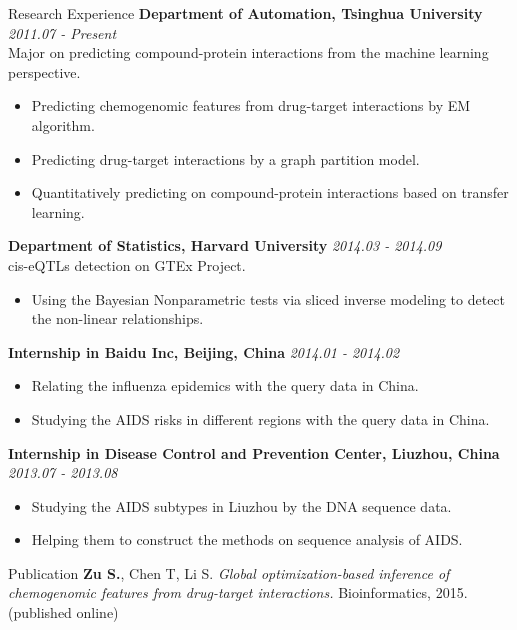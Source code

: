 \documentclass{resume} %
\begin{document}
\begin{rSection}{Research Experience}
{\bf Department of Automation, Tsinghua University} \hfill {\em 2011.07 - Present}\\
Major on predicting compound-protein interactions from the machine learning perspective.
\vspace{-3mm}
\begin{itemize}
\item Predicting chemogenomic features from drug-target interactions by EM algorithm.
\item Predicting drug-target interactions by a graph partition model.
\item Quantitatively predicting on compound-protein interactions based on transfer learning.
\end{itemize}
{\bf Department of Statistics, Harvard University} \hfill {\em 2014.03 - 2014.09} \\
cis-eQTLs detection on GTEx Project.
\vspace{-3mm}
\begin{itemize}
\item Using the Bayesian Nonparametric tests via sliced inverse modeling to detect the non-linear relationships.
\end{itemize}
{\bf Internship in Baidu Inc, Beijing, China} \hfill {\em 2014.01 - 2014.02}
\vspace{-3mm}
\begin{itemize}
\item  Relating the influenza epidemics with the query data in China.
\item  Studying the AIDS risks in different regions with the query data in China.
\end{itemize}
{\bf Internship in Disease Control and Prevention Center, Liuzhou, China} \hfill {\em 2013.07 - 2013.08}
\vspace{-3mm}
\begin{itemize}
\item Studying the AIDS subtypes in Liuzhou by the DNA sequence data.
\item Helping them to construct the methods on sequence analysis of AIDS.
\end{itemize}
\end{rSection}

\begin{rSection}{Publication}
{\bf Zu S.}, Chen T, Li S. {\it Global optimization-based inference of chemogenomic features from drug-target interactions.} Bioinformatics, 2015.
(published online)
\end{rSection}
\end{document}

